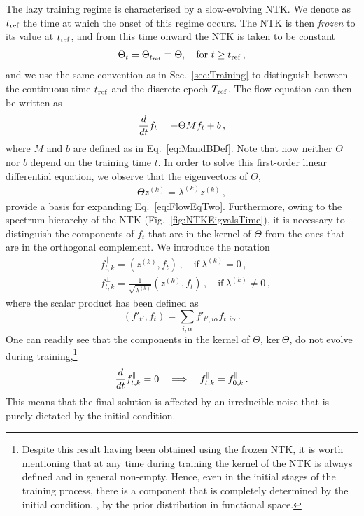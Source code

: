 The lazy training regime is characterised by a slow-evolving NTK. We denote as
$t_{\rm ref}$ the time at which the onset of this regime occurs. The NTK is then
\textit{frozen} to its value at $t_{\rm ref}$, and from this time onward the NTK
is taken to be constant
\begin{equation}
  \Theta_t = \Theta_{t_{\rm ref}} \equiv \Theta, \quad \textrm{for } t \geq t_{\rm ref}\,,
\end{equation} 
and we use the same convention as in Sec.~\ref{sec:Training} to distinguish
between the continuous time $t_{\rm ref}$ and the discrete epoch $T_{\rm ref}$. The flow
equation can then be written as
\begin{align}
  \frac{d}{dt} f_t = -\Theta M f_t + b\, ,
  \label{eq:FlowEqTwo}
\end{align}
where $M$ and $b$ are defined as in Eq.~\eqref{eq:MandBDef}. Note that now
neither $\Theta$ nor $b$ depend on the training time $t$. In order to solve this
first-order linear differential equation, we observe that the eigenvectors of
$\Theta$,
\begin{align}
    \label{eq:ThetaEigensystem}
    \Theta z^{(k)} = \lambda^{(k)} z^{(k)}\, ,
\end{align}
provide a basis for expanding Eq.~\eqref{eq:FlowEqTwo}. Furthermore, owing to
the spectrum hierarchy of the NTK (Fig.~\ref{fig:NTKEigvalsTime}), it is
necessary to distinguish the components of $f_t$ that are in the kernel of
$\Theta$ from the ones that are in the orthogonal complement. We introduce the
notation
\begin{align}
    \label{eq:ParallelComponents}
    &f^\parallel_{t,k} = \left(z^{(k)}, f_t\right)\, , \quad \text{if}\ \lambda^{(k)} = 0\, , \\
    \label{eq:OrthogonalComponents}
    &f^\perp_{t,k} = \frac{1}{\sqrt{\lambda^{(k)}}} \left(z^{(k)}, f_t\right)\, , \quad
        \text{if}\ \lambda^{(k)} \neq 0\, ,
\end{align}
where the scalar product has been defined as
\begin{equation}
  \left(f'_{t'}, f_t\right) = \sum_{i,\alpha} f'_{t',i\alpha} f_{t,i\alpha}\,.
\end{equation}
One can readily see that the components in the kernel of $\Theta$, $\text{ker}\
\Theta$, do not evolve during training,\footnote{Despite this result having been
obtained using the frozen NTK, it is worth mentioning that at any time during
training the kernel of the NTK is always defined and in general non-empty.
Hence, even in the initial stages of the training process, there is a component 
that is completely determined by the initial condition, \ie, by the prior distribution in
functional space.}
\begin{align}
    \label{eq:FlowParallel}
    \frac{d}{dt} f^\parallel_{t,k} = 0
        \quad \Longrightarrow \quad f^\parallel_{t,k} = f^\parallel_{0,k}\, .
\end{align}
This means that the final solution is affected by an irreducible noise that
is purely dictated by the initial condition.

